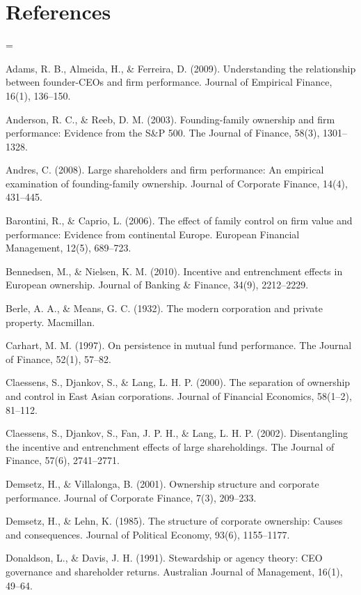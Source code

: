 \newpage
\section*{References}

\begingroup
\setlength{\parindent}{0pt}
\everypar={\hangindent=0.5in }

Adams, R. B., Almeida, H., \& Ferreira, D. (2009). Understanding the relationship between founder-CEOs and firm performance. Journal of Empirical Finance, 16(1), 136--150.

Anderson, R. C., \& Reeb, D. M. (2003). Founding-family ownership and firm performance: Evidence from the S\&P 500. The Journal of Finance, 58(3), 1301--1328.

Andres, C. (2008). Large shareholders and firm performance: An empirical examination of founding-family ownership. Journal of Corporate Finance, 14(4), 431--445.

Barontini, R., \& Caprio, L. (2006). The effect of family control on firm value and performance: Evidence from continental Europe. European Financial Management, 12(5), 689--723.

Bennedsen, M., \& Nielsen, K. M. (2010). Incentive and entrenchment effects in European ownership. Journal of Banking \& Finance, 34(9), 2212--2229.

Berle, A. A., \& Means, G. C. (1932). The modern corporation and private property. Macmillan.

Carhart, M. M. (1997). On persistence in mutual fund performance. The Journal of Finance, 52(1), 57--82.

Claessens, S., Djankov, S., \& Lang, L. H. P. (2000). The separation of ownership and control in East Asian corporations. Journal of Financial Economics, 58(1--2), 81--112.

Claessens, S., Djankov, S., Fan, J. P. H., \& Lang, L. H. P. (2002). Disentangling the incentive and entrenchment effects of large shareholdings. The Journal of Finance, 57(6), 2741--2771.

Demsetz, H., \& Villalonga, B. (2001). Ownership structure and corporate performance. Journal of Corporate Finance, 7(3), 209--233.

Demsetz, H., \& Lehn, K. (1985). The structure of corporate ownership: Causes and consequences. Journal of Political Economy, 93(6), 1155--1177.

Donaldson, L., \& Davis, J. H. (1991). Stewardship or agency theory: CEO governance and shareholder returns. Australian Journal of Management, 16(1), 49--64.

